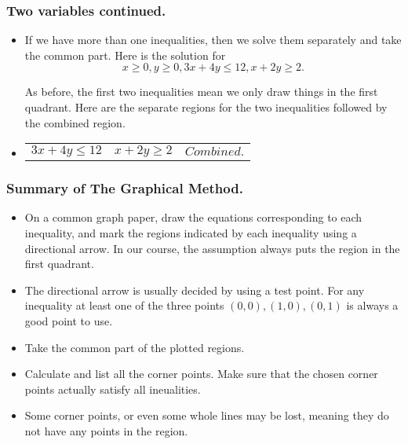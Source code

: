
\begin{frame}%
  \frametitle{Two variables continued.}
  \begin{itemize}%
 
\item
If we have more than one inequalities, then we solve them
separately and take the common part.
Here is the solution for
$$x\ge 0, y\ge 0, 3x+4y\le 12, x+2y\ge 2.$$                                

As before, the first two inequalities mean we only draw things in the
first quadrant.
Here are the separate regions for the two inequalities followed by the
combined region.
\item
\begin{tabular}{ccc}
\parbox{1.5in}{$3x+4y\le 12$\\} & 
\parbox{1.5in}{$x+2y\ge 2$\\} &
\parbox{1.5in}{$Combined.$\\}\\
\end{tabular}


\end{itemize}
\end{frame}


\begin{frame}%
  \frametitle{Summary of The Graphical Method.}
  \begin{itemize}%
\item
On a common graph paper, draw the equations corresponding to each inequality,
and mark the regions indicated by each inequality using a directional arrow.
In our course, the assumption always puts the region in the first
quadrant.
\item The directional arrow is usually decided by using a test point. For
any inequality at least one of the three points $(0,0), (1,0), (0,1)$ is always a
good point to use.
\item Take the common part of the plotted regions.
\item Calculate and list all the corner points. Make sure that the
chosen corner points actually satisfy all ineualities.
\item Some corner points, or even some whole lines may be lost, meaning
they do not have any points in the region.

\end{itemize}
\end{frame}


